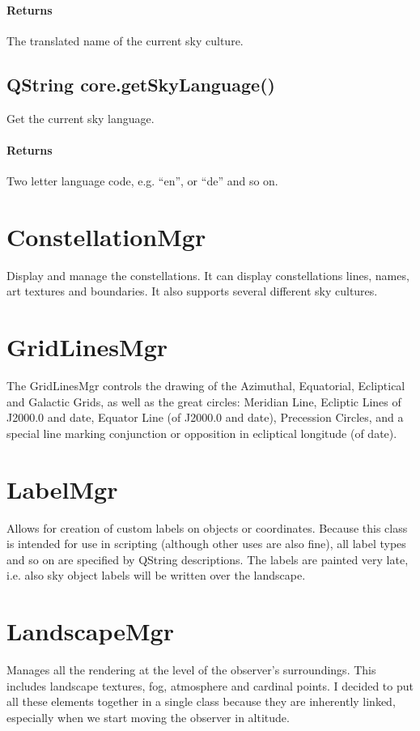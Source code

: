 \paragraph{Returns}
The translated name of the current sky culture.

\subsection{QString core.getSkyLanguage()}
\label{sec:ScriptingAPI:core:getSkyLanguage}
Get the current sky language.

\paragraph{Returns}
Two letter language code, e.g. ``en'', or ``de'' and so on.

\section{ConstellationMgr}
\label{sec:ScriptingAPI:ConstellationMgr}
Display and manage the constellations. It can display constellations lines, names, art textures and boundaries. It also supports several different sky cultures.

\section{GridLinesMgr}
\label{sec:ScriptingAPI:GridLinesMgr}
The GridLinesMgr controls the drawing of the Azimuthal, Equatorial, Ecliptical and Galactic Grids, as well as the great circles: Meridian Line, Ecliptic Lines of J2000.0 and date, Equator Line (of J2000.0 and date), Precession Circles, and a special line marking conjunction or opposition in ecliptical longitude (of date).

\section{LabelMgr}
\label{sec:ScriptingAPI:LabelMgr}
Allows for creation of custom labels on objects or coordinates. Because this class is intended for use in scripting (although other uses are also fine), all label types and so on are specified by QString descriptions. The labels are painted very late, i.e. also sky object labels will be written over the landscape.

\section{LandscapeMgr}
\label{sec:ScriptingAPI:LandscapeMgr}
Manages all the rendering at the level of the observer's surroundings. This includes landscape textures, fog, atmosphere and cardinal points. I decided to put all these elements together in a single class because they are inherently linked, especially when we start moving the observer in altitude.

